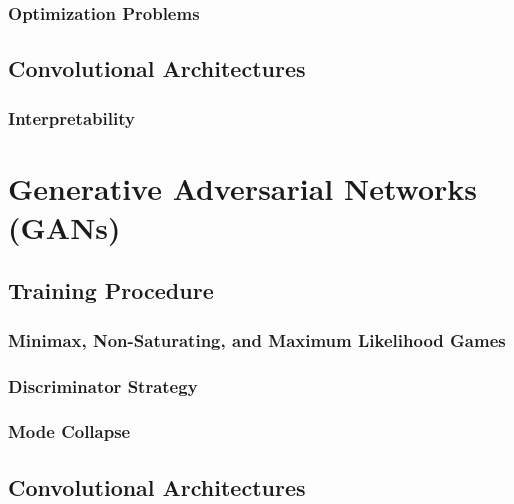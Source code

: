 			\subsubsection{Optimization Problems} %

		\subsection{Convolutional Architectures} %

			\subsubsection{Interpretability} %

	\section{Generative Adversarial Networks (GANs)} %

		\subsection{Training Procedure} %

			\subsubsection{Minimax, Non-Saturating, and Maximum Likelihood Games} %

			\subsubsection{Discriminator Strategy} %

			\subsubsection{Mode Collapse} %

		\subsection{Convolutional Architectures} %

